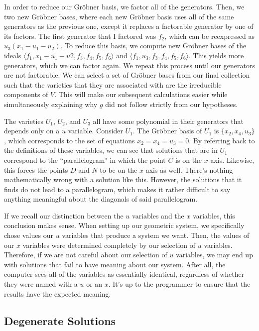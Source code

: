 \documentclass{article}
\theoremstyle{plain}
\theoremstyle{definition}
\theoremstyle{remark}
\newcommand{\gro}{Gr\"obner }
\begin{document}
In order to reduce our \gro basis, we factor all of the generators. 
Then, we two new \gro bases, where each new \gro basis uses all of the same generators as the previous one, except it replaces a factorable generator by one of its factors.
The first generator that I factored was $f_2$, which can be reexpressed as $u_3(x_1 - u_1 - u_2)$.
To reduce this basis, we compute new \gro bases of the ideals $\langle f_1, x_1 - u_1 - u2, f_3, f_4, f_5, f_6 \rangle$ and $\langle f_1, u_3, f_3, f_4, f_5, f_6 \rangle$.
This yields more generators, which we can factor again. We repeat this process until our generators are not factorable. 
We can select a set of \gro bases from our final collection such that the varieties that they are associated with are the irreducible components of $V$.
This will make our subsequent calculations easier while simultaneously explaining why $g$ did not follow strictly from our hypotheses.

The varieties $U_1$, $U_2$, and $U_3$ all have some polynomial in their generators that depends only on a $u$ variable.
Consider $U_1$. The \gro basis of $U_1$ is $\{ x_2, x_4, u_3\}$, which corresponds to the set of equations $x_2 = x_4 = u_3 = 0$. 
By referring back to the definitions of these variables, we can see that solutions that are in $U_1$ correspond to the ``parallelogram" in which the point $C$ is on the $x$-axis.
Likewise, this forces the points $D$ and $N$ to be on the $x$-axis as well.
There's nothing mathematically wrong with a solution like this. 
However, the solutions that it finds do not lead to a parallelogram, which makes it rather difficult to say anything meaningful about the diagonals of said parallelogram.

If we recall our distinction between the $u$ variables and the $x$ variables, this conclusion makes sense.
When setting up our geometric system, we specifically chose values our $u$ variables that produce a system we want. 
Then, the values of our $x$ variables were determined completely by our selection of $u$ variables.
Therefore, if we are not careful about our selection of $u$ variables, we may end up with solutions that fail to have meaning about our system.
After all, the computer sees all of the variables as essentially identical, regardless of whether they were named with a $u$ or an $x$. 
It's up to the programmer to ensure that the results have the expected meaning.

\subsection{Degenerate Solutions}
\end{document}

